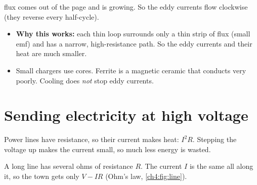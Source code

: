 \begin{sidebyside}[0.6]
{    flux comes out of the page and is growing. So the eddy currents flow clockwise (they
    reverse every half-cycle).}
  \label{ch4:fig:eddy}
\nextside
  \begin{itemize}
    \item \textbf{Why this works:} each thin loop surrounds only a thin strip of flux
          (small emf) and has a narrow, high-resistance path. So the eddy currents and
          their heat are much smaller.
    \item Small chargers use  cores. Ferrite is a magnetic ceramic that
          conducts very poorly. Cooling does
          \emph{not} stop eddy currents.
  \end{itemize}
\end{sidebyside}


\section{Sending electricity at high voltage}\label{ch4:sec:transmission}

\begin{bigidea}
Power lines have resistance, so their current makes heat: $I^2R$. Stepping the voltage
up makes the current small, so much less energy is wasted.
\end{bigidea}


\begin{keywords}
\end{keywords}

A long line has several ohms of resistance $R$. The current $I$ is the same all along it,
so the town gets only $V - IR$ (Ohm's law, \cref{ch4:fig:line}).

